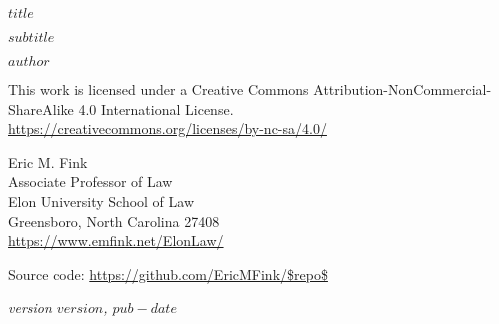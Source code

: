 \color{OffBlack}

\frontmatter

\thispagestyle{empty}

\begin{flushright}

\vspace*{50mm}

{\bfseries\Huge{$title$}} 

{\bfseries\vspace{5mm}}

{\Large{$subtitle$}} 

\vspace{20mm}

{\normalsize{$author$}} 

\vspace*{\fill}

\begin{small}



\rmfamily{\monthyear} 

\end{small}

\end{flushright}

\clearpage

\thispagestyle{empty}
\begingroup
\parindent 0pt
\vspace*{\fill}

\ccbyncsa

\begin{small}
\raggedright{This work is licensed under a Creative Commons Attribution-NonCommercial-ShareAlike 4.0 International License.} \\
\url{https://creativecommons.org/licenses/by-nc-sa/4.0/}
\end{small}

\vspace{1em}

\begin{small}
Eric M. Fink\\
Associate Professor of Law \\
Elon University School of Law \\
Greensboro, North Carolina 27408 \\
\url{https://www.emfink.net/ElonLaw/}

\vspace{1em}

Source code: \url{https://github.com/EricMFink/$repo$}

\itshape{version $version$, $pub-date$}

\end{small}
\endgroup

